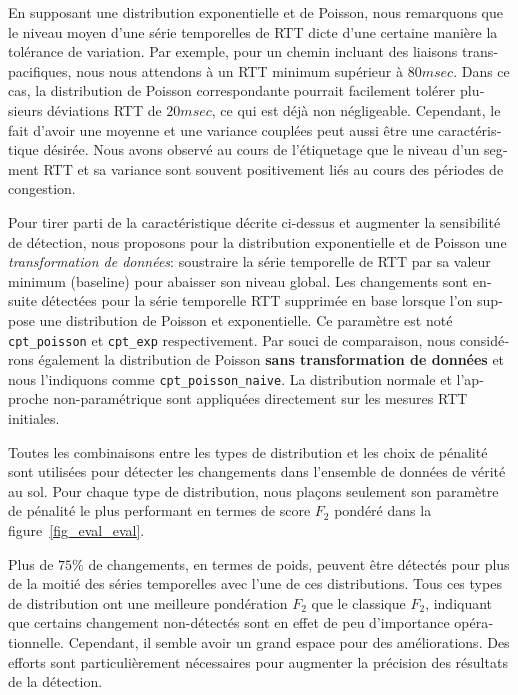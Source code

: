 \begin{otherlanguage}{french}
En supposant une distribution exponentielle et de Poisson, 
nous remarquons que le niveau moyen d'une série temporelles de RTT dicte d'une certaine manière la tolérance de variation.
Par exemple, pour un chemin incluant des liaisons transpacifiques, nous nous attendons à un RTT minimum supérieur à $80msec$.
Dans ce cas, la distribution de Poisson correspondante pourrait facilement tolérer plusieurs déviations RTT de $20msec$, ce qui est déjà non négligeable.
Cependant, le fait d'avoir une moyenne et une variance couplées peut aussi être une caractéristique désirée.
Nous avons observé au cours de l'étiquetage que le niveau d'un segment RTT et sa variance sont souvent positivement liés au cours des périodes de congestion.

Pour tirer parti de la caractéristique décrite ci-dessus et augmenter la sensibilité de détection, nous proposons pour la distribution exponentielle et de Poisson une \textit{transformation de données}: 
soustraire la série temporelle de RTT par sa valeur minimum (baseline) pour abaisser son niveau global.
Les changements sont ensuite détectées pour la série temporelle RTT supprimée en base lorsque l'on suppose une distribution de Poisson et exponentielle.
Ce paramètre est noté \texttt{cpt\_poisson} et \texttt{cpt\_exp} respectivement.
Par souci de comparaison, nous considérons également la distribution de Poisson \textbf{sans transformation de données} 
et nous l'indiquons comme \texttt{cpt\_poisson\_naive}.
La distribution normale et l'approche non-paramétrique sont appliquées directement sur les mesures RTT initiales.

Toutes les combinaisons entre les types de distribution et les choix de pénalité sont utilisées pour détecter les changements dans l'ensemble de données de vérité au sol.
Pour chaque type de distribution, nous plaçons seulement son paramètre de pénalité le plus performant en termes de score $F_2$ pondéré dans la figure~\ref {fig_eval_eval}.

Plus de $ 75\%$ de changements, en termes de poids, peuvent être détectés pour plus de la moitié des séries temporelles avec l'une de ces distributions.
Tous ces types de distribution ont une meilleure pondération $F_2$ que le classique $F_2$, indiquant que certains changement non-détectés sont en effet de peu d'importance opérationnelle.
Cependant, il semble avoir un grand espace pour des améliorations.
Des efforts sont particulièrement nécessaires pour augmenter la précision des résultats de la détection.


\end{otherlanguage}

